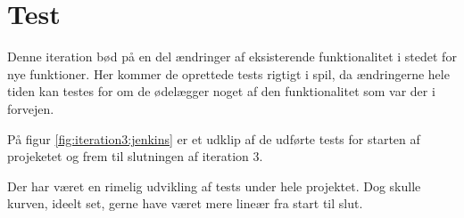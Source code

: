 \section{Test}

Denne iteration bød på en del ændringer af eksisterende funktionalitet i stedet for nye funktioner. Her kommer de oprettede tests rigtigt i spil, da ændringerne hele tiden kan testes for om de ødelægger noget af den funktionalitet som var der i forvejen.

På figur \ref{fig:iteration3:jenkins} er et udklip af de udførte tests for starten af projeketet og frem til slutningen af iteration 3.


Der har været en rimelig udvikling af tests under hele projektet. Dog skulle kurven, ideelt set, gerne have været mere lineær fra start til slut.